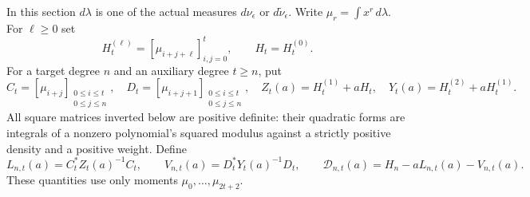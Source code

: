 In this section $d\lambda$ is one of the actual measures
$d\nu_\epsilon$ or $d\widetilde\nu_\epsilon$.  Write
$\mu_r=\int x^r\,d\lambda$.  For $\ell\ge0$ set
\[
 H_t^{(\ell)}=[\mu_{i+j+\ell}]_{i,j=0}^t,
 \qquad H_t=H_t^{(0)}.
\]
For a target degree $n$ and an auxiliary degree $t\ge n$, put
\begin{equation}\label{mmnative:eq:rectangular}
 C_t=[\mu_{i+j}]_{\substack{0\le i\le t\\0\le j\le n}},
 \quad D_t=[\mu_{i+j+1}]_{\substack{0\le i\le t\\0\le j\le n}},
 \quad Z_t(a)=H_t^{(1)}+aH_t,
 \quad Y_t(a)=H_t^{(2)}+aH_t^{(1)}.
\end{equation}
All square matrices inverted below are positive definite: their
quadratic forms are integrals of a nonzero polynomial's squared
modulus against a strictly positive density and a positive weight.
Define
\begin{equation}\label{mmnative:eq:variational}
 L_{n,t}(a)=C_t^*Z_t(a)^{-1}C_t,
 \qquad V_{n,t}(a)=D_t^*Y_t(a)^{-1}D_t,
 \qquad\mathcal D_{n,t}(a)=H_n-aL_{n,t}(a)-V_{n,t}(a).
\end{equation}
These quantities use only moments $\mu_0,\ldots,\mu_{2t+2}$.

